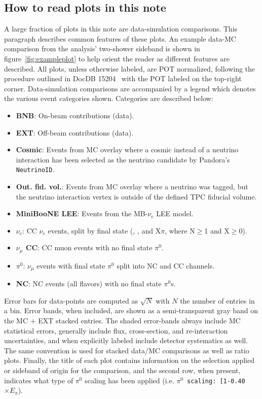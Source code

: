 \subsection{How to read plots in this note} A large fraction of plots in this note are data-simulation comparisons. This paragraph describes common features of these plots. An example data-MC comparison from the analysis' two-shower sideband is shown in figure~\ref{fig:exampleplot} to help orient the reader as different features are described. All plots, unless otherwise labeled, are POT normalized, following the procedure outlined in DocDB 15204~\cite{bib:POTscaling} with the POT labeled on the top-right corner. Data-simulation comparisons are accompanied by a legend which denotes the various event categories shown. Categories are described below:
\begin{itemize}
    \item \textbf{BNB}: On-beam contributions (data).
    \item \textbf{EXT}: Off-beam contributions (data).
    \item \textbf{Cosmic}: Events from MC overlay where a cosmic instead of a neutrino interaction has been selected as the neutrino candidate by Pandora's \texttt{NeutrinoID}.
    \item \textbf{Out. fid. vol.}: Events from MC overlay where a neutrino was tagged, but the neutrino interaction vertex is outside of the defined TPC fiducial volume.
    \item \textbf{MiniBooNE LEE}: Events from the MB-$\nu_e$ LEE model.
    \item \textbf{$\nu_e$}: CC $\nu_e$ events, split by final state (\zpsel, \npsel, and X$\pi$, where N$\geq$1 and X$\geq$0).
    \item \textbf{$\nu_{\mu}$ CC}: CC muon events with no final state $\pi^0$.
    \item \textbf{$\pi^0$}: $\nu_{\mu}$ events with final state $\pi^0$ split into NC and CC channels.
    \item \textbf{NC}: NC events (all flavors) with no final state $\pi^0$s.
\end{itemize}{}

Error bars for data-points are computed as $\sqrt{N}$ with $N$ the number of entries in a bin. Error bands, when included, are shown as a semi-transparent gray band on the MC + EXT stacked entries. The shaded error-bands always include MC statistical errors, generally include flux, cross-section, and re-interaction uncertainties, and when explicitly labeled include detector systematics as well. The same convention is used for stacked data/MC comparisons as well as ratio plots. Finally, the title of each plot contains information on the selection applied or sideband of  origin for the comparison, and the second row, when present, indicates what type of $\pi^0$ scaling has been applied (i.e. \texttt{$\pi^0$ scaling: [1-0.40 $\times E_{\pi}$}).


